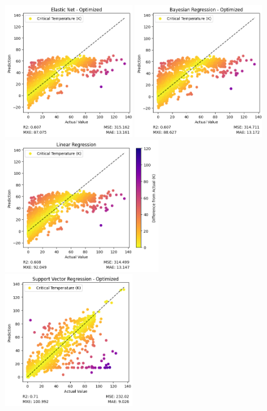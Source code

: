 \documentclass[twocolumn, nofootinbib, secnumarabic, amssymb, nobibnotes, aps, prd]{revtex4-2}
\begin{document}
\begin{figure}[t] %
   \centering
   \includegraphics[height=2.25in]{images/subfigures/no_uncertainty/elastic_net_optimized.png}
   \includegraphics[height=2.25in]{images/subfigures/no_uncertainty/bayesian_regression_optimized.png}
   \includegraphics[height=2.25in]{images/subfigures/no_uncertainty/linear_regression.png}
   \includegraphics[height=2.25in]{images/subfigures/no_uncertainty/support_vector_regression_optimized.png}

\end{figure}
\end{document}
